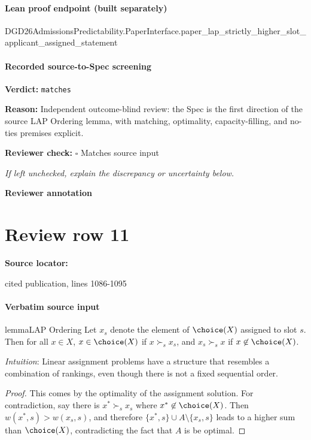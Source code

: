 \documentclass[10pt]{article}
\newcommand{\reviewerbox}{%
  \par\noindent\fbox{\parbox{0.96\linewidth}{\rule{0pt}{0.38in}}}\par
}
\newcommand{\reviewmatch}[1]{%
  \par\noindent\textbf{Reviewer check:} $\square$\; #1\par
  \noindent\emph{If left unchecked, explain the discrepancy or uncertainty below.}\par
}
\begin{document}
\paragraph{Lean proof endpoint (built separately)}\begin{ReviewVerbatim}
DGD26AdmissionsPredictability.PaperInterface.paper_lap_strictly_higher_slot_applicant_assigned_statement
\end{ReviewVerbatim}

\paragraph{Recorded source-to-Spec screening}
\textbf{Verdict:} \texttt{matches}
\\
{\raggedright
\textbf{Reason:} Independent outcome-\allowbreak{}blind review:\allowbreak{} the Spec is the first direction of the source LAP Ordering lemma, with matching, optimality, capacity-\allowbreak{}filling, and no-\allowbreak{}ties premises explicit.\allowbreak{}
\par}
\reviewmatch{Matches source input}
\noindent\textbf{Reviewer annotation}\par
\reviewerbox
\clearpage
\hypertarget{source-claim-5e3bd8769e715d3c}{}
\section*{Review row 11}
\textbf{Source locator:} {\footnotesize\raggedright cited publication, lines 1086-\allowbreak{}1095\par}
\paragraph{Verbatim source input}
\begin{ReviewVerbatim}
\begin{restatable}{lemma}{LAP Ordering}
\label{lem:lap-ordering}
Let $x_{s}$ denote the element of $\choice(X)$ assigned to slot $s$. Then for all $x \in X$, $x \in \choice(X)$ if $x \succ_s x_s$, and $x_s \succ_s x$ if $x \not\in \choice(X)$.
\end{restatable}

\textit{Intuition}: Linear assignment problems have a structure that resembles a combination of rankings, even though there is not a fixed sequential order.

\begin{proof}
This comes by the optimality of the assignment solution. For contradiction, say there is $x^* \succ_s x_s$ where $x^* \not\in \choice(X)$. Then $w(x^*, s) > w(x_s, s)$, and therefore $\{x^*, s\} \cup A \setminus \{x_s, s\}$ leads to a higher sum than $\choice(X)$, contradicting the fact that $A$ is be optimal.
\end{proof}
\end{ReviewVerbatim}
\end{document}
